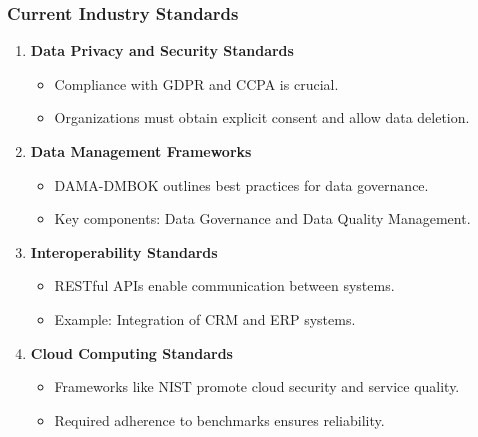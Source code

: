 \documentclass[aspectratio=169]{beamer}
\begin{document}
\begin{frame}[fragile]
    \frametitle{Current Industry Standards}
    \begin{enumerate}
        \item \textbf{Data Privacy and Security Standards}
            \begin{itemize}
                \item Compliance with GDPR and CCPA is crucial.
                \item Organizations must obtain explicit consent and allow data deletion.
            \end{itemize}

        \item \textbf{Data Management Frameworks}
            \begin{itemize}
                \item DAMA-DMBOK outlines best practices for data governance.
                \item Key components: Data Governance and Data Quality Management.
            \end{itemize}

        \item \textbf{Interoperability Standards}
            \begin{itemize}
                \item RESTful APIs enable communication between systems.
                \item Example: Integration of CRM and ERP systems.
            \end{itemize}

        \item \textbf{Cloud Computing Standards}
            \begin{itemize}
                \item Frameworks like NIST promote cloud security and service quality.
                \item Required adherence to benchmarks ensures reliability.
            \end{itemize}
    \end{enumerate}
\end{frame}
\end{document}
